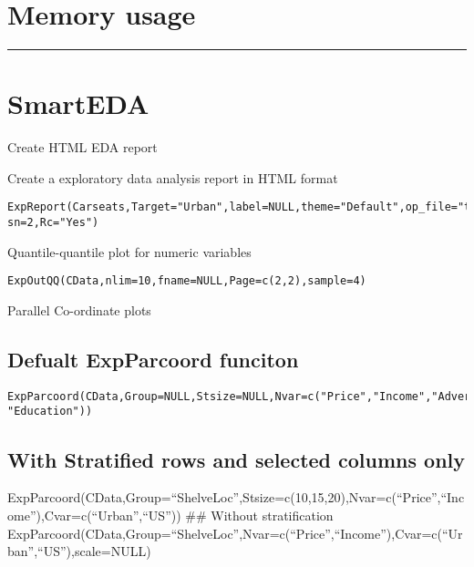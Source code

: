 \documentclass[]{article}
\begin{document}
\hypertarget{memory-usage}{%
\section{Memory usage}\label{memory-usage}}

\begin{center}\rule{0.5\linewidth}{\linethickness}\end{center}

\hypertarget{smarteda}{%
\section{SmartEDA}\label{smarteda}}

Create HTML EDA report

Create a exploratory data analysis report in HTML format

\begin{verbatim}
ExpReport(Carseats,Target="Urban",label=NULL,theme="Default",op_file="test.html",op_dir=getwd(),sc=2,
sn=2,Rc="Yes")
\end{verbatim}

Quantile-quantile plot for numeric variables

\begin{verbatim}
ExpOutQQ(CData,nlim=10,fname=NULL,Page=c(2,2),sample=4)
\end{verbatim}

Parallel Co-ordinate plots

\hypertarget{defualt-expparcoord-funciton}{%
\subsection{Defualt ExpParcoord
funciton}\label{defualt-expparcoord-funciton}}

\begin{verbatim}
ExpParcoord(CData,Group=NULL,Stsize=NULL,Nvar=c("Price","Income","Advertising","Population","Age",
"Education"))
\end{verbatim}

\hypertarget{with-stratified-rows-and-selected-columns-only}{%
\subsection{With Stratified rows and selected columns
only}\label{with-stratified-rows-and-selected-columns-only}}

ExpParcoord(CData,Group=``ShelveLoc'',Stsize=c(10,15,20),Nvar=c(``Price'',``Income''),Cvar=c(``Urban'',``US''))
\#\# Without stratification
ExpParcoord(CData,Group=``ShelveLoc'',Nvar=c(``Price'',``Income''),Cvar=c(``Urban'',``US''),scale=NULL)
\end{document}
